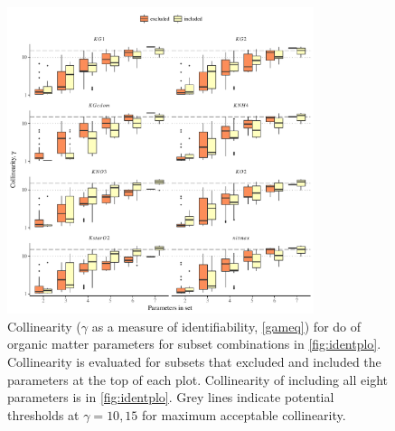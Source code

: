 \documentclass[review]{elsarticle}\usepackage[]{graphicx}\usepackage[]{color}
\begin{document}
\begin{figure}[!ht]

{\centering \includegraphics[width=0.8\textwidth]{figs/exclex-1} 

}

\caption{Collinearity ($\gamma$ as a measure of identifiability, \cref{gameq}) for \ac{do} of organic matter parameters for subset combinations in \cref{fig:identplo}.  Collinearity is evaluated for subsets that excluded and included the parameters at the top of each plot. Collinearity of including all eight parameters is in \cref{fig:identplo}. Grey lines indicate potential thresholds at $\gamma = 10, 15$ for maximum acceptable collinearity.}\label{fig:exclex}
\end{figure}
\end{document}
